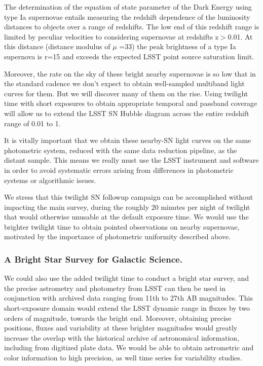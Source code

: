 The determination of the equation of state parameter of the Dark Energy
using type Ia supernovae entails measuring the redshift dependence of
the luminosity distances to objects over a range of redshifts. The low
end of this redshift range is limited by peculiar velocities to
considering supernovae at redshifts z$>$0.01. At this distance (distance
modulus of $\mu$ =33) the peak brightness of a type Ia supernova is r=15
and exceeds the expected LSST point source saturation limit.

Moreover, the rate on the sky of these bright nearby supernovae is so
low that in the standard cadence we don't expect to obtain well-sampled
multiband light curves for them. But we will discover many of them on
the rise. Using twilight time with short exposures to obtain appropriate
temporal and passband coverage will allow us to extend the LSST SN
Hubble diagram across the entire redshift range of 0.01 to 1.

It is vitally important that we obtain these nearby-SN light curves on
the same photometric system, reduced with the same data reduction
pipeline, as the distant sample. This means we really must use the LSST
instrument and software in order to avoid systematic errors arising from
differences in photometric systems or algorithmic issues.

We stress that this twilight SN followup campaign can be accomplished
without impacting the main survey, during the roughly 20 minutes per
night of twilight that would otherwise unusable at the default exposure
time. We would use the brighter twilight time to obtain pointed
observations on nearby supernovae, motivated by the importance of
photometric uniformity described above.


\subsubsection{A Bright Star Survey for Galactic Science.}

We could also use the added twilight time to conduct a bright star
survey, and the precise astrometry and photometry from LSST can then be
used in conjunction with archived data ranging from 11th to 27th AB
magnitudes. This short-exposure domain would extend the LSST dynamic
range in fluxes by two orders of magnitude, towards the bright end.
Moreover, obtaining precise positions, fluxes and variability at these
brighter magnitudes would greatly increase the overlap with the
historical archive of astronomical information, including from digitized
plate data. We would be able to obtain astrometric and color information
to high precision, as well time series for variability studies.


